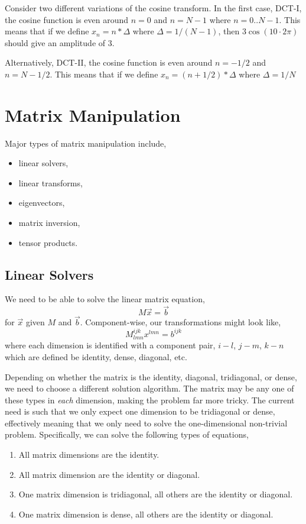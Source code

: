 \documentclass[11pt]{article}
\begin{document}
Consider two different variations of the cosine transform. In the first case, DCT-I, the cosine function is even around $n=0$ and $n=N-1$ where $n=0..N-1$. This means that if we define $x_n = n*\Delta$ where $\Delta = 1/(N-1)$, then $3\cos( 10 \cdot 2\pi)$ should give an amplitude of 3.

Alternatively, DCT-II, the cosine function is even around $n=-1/2$ and $n=N-1/2$. This means that if we define $x_n = (n+1/2)*\Delta$ where $\Delta = 1/N$

%
%

\section{Matrix Manipulation}

Major types of matrix manipulation include,
\begin{itemize}
\item linear solvers,
\item linear transforms,
\item eigenvectors,
\item matrix inversion,
\item tensor products.
\end{itemize}

\subsection{Linear Solvers}

We need to be able to solve the linear matrix equation,
\begin{equation}
M \vec{x} = \vec{b}
\end{equation}
for $\vec{x}$ given $M$ and $\vec{b}$. Component-wise, our transformations might look like,
\begin{equation}
M^{ijk}_{lmn} x^{lmn} = b^{ijk}
\end{equation}
where each dimension is identified with a component pair, $i-l$, $j-m$, $k-n$ which are defined be identity, dense, diagonal, etc.

Depending on whether the matrix is the identity, diagonal, tridiagonal, or dense, we need to choose a different solution algorithm. The matrix may be any one of these types in \emph{each} dimension, making the problem far more tricky. The current need is such that we only expect one dimension to be tridiagonal or dense, effectively meaning that we only need to solve the one-dimensional non-trivial problem. Specifically, we can solve the following types of equations,
\begin{enumerate}
\item All matrix dimensions are the identity.
\item All matrix dimension are the identity or diagonal.
\item One matrix dimension is tridiagonal, all others are the identity or diagonal.
\item One matrix dimension is dense, all others are the identity or diagonal.
\end{enumerate}
\end{document}
